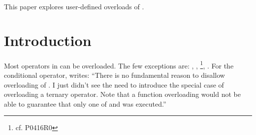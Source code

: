 \newcommand\wgTitle{Making operator?: overloadable}
\newcommand\wgName{Matthias Kretz <m.kretz@gsi.de>}
\newcommand\wgDocumentNumber{P0917R0}
\newcommand\wgGroup{EWG}

\usepackage{mymacros}
\usepackage{wg21}
\usepackage{underscore}



\newcommand\simd[1][]{\type{simd#1}\xspace}
\newcommand\simdT{\type{simd<T>}\xspace}
\newcommand\valuetype{\type{value\_type}\xspace}
\newcommand\referencetype{\type{reference}\xspace}
\newcommand\whereexpression{\type{where\_expression}\xspace}
\newcommand\simdcast{\code{simd\_cast}\xspace}
\newcommand\mask[1][]{\type{simd\_mask#1}\xspace}
\newcommand\maskT{\type{simd\_mask<T>}\xspace}
\newcommand\fixedsizeN{\type{simd\_abi::fixed\_size<N>}\xspace}
\newcommand\fixedsizescoped{\type{simd\_abi::fixed\_size}\xspace}
\newcommand\fixedsize{\type{fixed\_size}\xspace}
\newcommand\simdEP{\code{execution::}\type{simd}\xspace}
\newcommand\seqEP{\code{execution::}\type{seq}\xspace}

\usepackage{pifont}

\newcommand\foralli[1][]{for all \code i $\in$ \code{[0, #1size())}\xspace}
\newcommand\forallmaskedi[1]{%
  for all \code i
  $\in \{j \in \mathbb{N}_0 | j < \code{size()} ⋀ \code{#1[}j\code{]}\}$%
  \xspace%
}
\newcommand\chck{\item[\color{black}\ensuremath{\checkmark}]}
\newcommand\todo{\item[\color{black}\ding{46}] \color{gray}}
\newcommand\itemheader[1]{\item[] \hfill \textcolor{gray}{\textsc{#1}}}


\begin{wgTitlepage}
  This paper explores user-defined overloads of .
\end{wgTitlepage}

\pagestyle{scrheadings}
\section{Introduction}
Most operators in \CC{} can be overloaded.
The few exceptions are: , \code{::}, \footnote{cf. P0416R0}, .
For the conditional operator, \textcite{StrFaq} writes:
“There is no fundamental reason to disallow overloading of .
I just didn't see the need to introduce the special case of overloading a ternary operator.
Note that a function overloading  would not be able to guarantee that only one of  and  was executed.”


